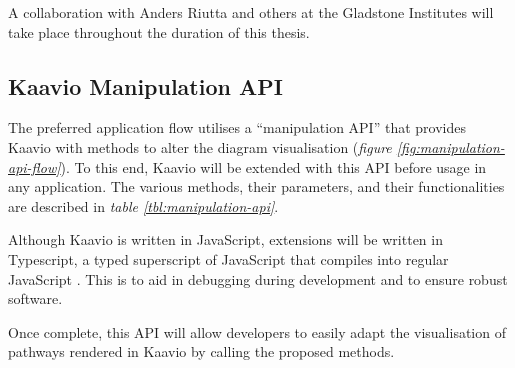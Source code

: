 \documentclass[a4paper,12pt,twoside]{apa}
\begin{document}
A collaboration with Anders Riutta and others at the Gladstone Institutes will take place throughout the duration of this thesis.

\FloatBarrier
\subsection{Kaavio Manipulation API}
The preferred application flow utilises a ``manipulation API'' that provides Kaavio with methods to alter the diagram visualisation (\textit{figure \ref{fig:manipulation-api-flow}}). To this end, Kaavio will be extended with this API before usage in any application. The various methods, their parameters, and their functionalities are described in \textit{table \ref{tbl:manipulation-api}}.

Although Kaavio is written in JavaScript, extensions will be written in Typescript, a typed superscript of JavaScript that compiles into regular JavaScript \cite{Typescript}. This is to aid in debugging during development and to ensure robust software.

Once complete, this API will allow developers to easily adapt the visualisation of pathways rendered in Kaavio by calling the proposed methods.
\end{document}
